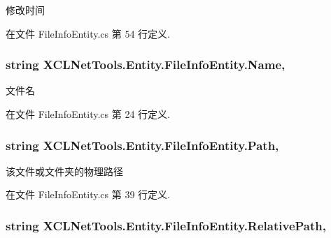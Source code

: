 修改时间 



在文件 File\-Info\-Entity.\-cs 第 54 行定义.

\hypertarget{class_x_c_l_net_tools_1_1_entity_1_1_file_info_entity_a15a2bb6c738c32250f00604b6636cae4}{
\subsubsection[{Name}]{\setlength{\rightskip}{0pt plus 5cm}string X\-C\-L\-Net\-Tools.\-Entity.\-File\-Info\-Entity.\-Name\hspace{0.3cm}{\ttfamily [get]}, {\ttfamily [set]}}}\label{class_x_c_l_net_tools_1_1_entity_1_1_file_info_entity_a15a2bb6c738c32250f00604b6636cae4}


文件名 



在文件 File\-Info\-Entity.\-cs 第 24 行定义.

\hypertarget{class_x_c_l_net_tools_1_1_entity_1_1_file_info_entity_a67f485c1a1af6205351305756d515e98}{
\subsubsection[{Path}]{\setlength{\rightskip}{0pt plus 5cm}string X\-C\-L\-Net\-Tools.\-Entity.\-File\-Info\-Entity.\-Path\hspace{0.3cm}{\ttfamily [get]}, {\ttfamily [set]}}}\label{class_x_c_l_net_tools_1_1_entity_1_1_file_info_entity_a67f485c1a1af6205351305756d515e98}


该文件或文件夹的物理路径 



在文件 File\-Info\-Entity.\-cs 第 39 行定义.

\hypertarget{class_x_c_l_net_tools_1_1_entity_1_1_file_info_entity_a795982d186fa2d1ef0e3fb51705f36b2}{
\subsubsection[{Relative\-Path}]{\setlength{\rightskip}{0pt plus 5cm}string X\-C\-L\-Net\-Tools.\-Entity.\-File\-Info\-Entity.\-Relative\-Path\hspace{0.3cm}{\ttfamily [get]}, {\ttfamily [set]}}}\label{class_x_c_l_net_tools_1_1_entity_1_1_file_info_entity_a795982d186fa2d1ef0e3fb51705f36b2}


